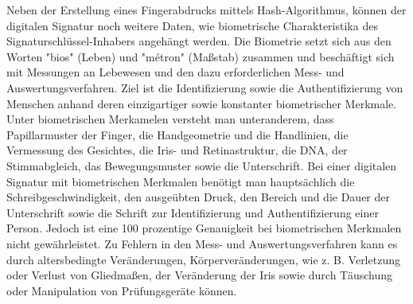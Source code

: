 Neben der Erstellung eines Fingerabdrucks mittels Hash-Algorithmus, können der digitalen Signatur noch weitere Daten, wie biometrische Charakteristika des Signaturschlüssel-Inhabers angehängt werden. Die Biometrie setzt sich aus den Worten "bios" (Leben) und "métron" (Maßstab) zusammen und beschäftigt sich mit Messungen an Lebewesen und den dazu erforderlichen Mess- und Auswertungsverfahren. \cite{bioMet1} Ziel ist die Identifizierung sowie die Authentifizierung von Menschen anhand deren einzigartiger sowie konstanter biometrischer Merkmale. Unter biometrischen Merkamelen versteht man unteranderem, dass Papillarmuster der Finger, die Handgeometrie und die Handlinien, die Vermessung des Gesichtes, die Iris- und Retinastruktur, die DNA, der Stimmabgleich, das Bewegungsmuster sowie die Unterschrift. Bei einer digitalen Signatur mit biometrischen Merkmalen benötigt man hauptsächlich die Schreibgeschwindigkeit, den ausgeübten Druck, den Bereich und die Dauer der Unterschrift sowie die Schrift zur Identifizierung und Authentifizierung einer Person. Jedoch ist eine 100 prozentige Genauigkeit bei biometrischen Merkmalen nicht gewährleistet. Zu Fehlern in den Mess- und Auswertungsverfahren kann es durch altersbedingte Veränderungen, Körperveränderungen, wie z. B. Verletzung oder Verlust von Gliedmaßen, der Veränderung der Iris sowie durch Täuschung oder Manipulation von Prüfungsgeräte können. \cite{bioMet2}\cite{bioMet3}